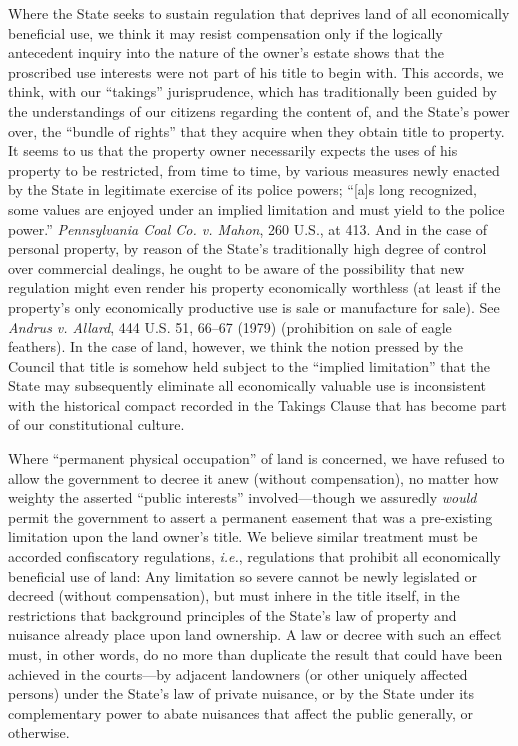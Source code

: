 Where the State seeks to sustain regulation that deprives land of all
economically beneficial use, we think it may resist compensation only if the
logically antecedent inquiry into the nature of the owner's estate shows that
the proscribed use interests were not part of his title to begin with. This
accords, we think, with our ``takings'' jurisprudence, which has traditionally
been guided by the understandings of our citizens regarding the content of, and
the State's power over, the ``bundle of rights'' that they acquire when they
obtain title to property. It seems to us that the property owner necessarily
expects the uses of his property to be restricted, from time to time, by various
measures newly enacted by the State in legitimate exercise of its police powers;
``[a]s long recognized, some values are enjoyed under an implied limitation and
must yield to the police power.'' \textit{Pennsylvania Coal Co. v. Mahon}, 260
U.S., at 413. And in the case of personal property, by reason of the State's
traditionally high degree of control over commercial dealings, he ought to be
aware of the possibility that new regulation might even render his property
economically worthless (at least if the property's only economically productive
use is sale or manufacture for sale). See \textit{Andrus v. Allard}, 444 U.S.
51, 66--67 (1979) (prohibition on sale of eagle feathers). In the case of land,
however, we think the notion pressed by the Council that title is somehow held
subject to the ``implied limitation'' that the State may subsequently eliminate
all economically valuable use is inconsistent with the historical compact
recorded in the Takings Clause that has become part of our constitutional
culture.

Where ``permanent physical occupation'' of land is concerned, we have refused to
allow the government to decree it anew (without compensation), no matter how
weighty the asserted ``public interests'' involved---though we assuredly
\textit{would} permit the government to assert a permanent easement that was a
pre-existing limitation upon the land owner's title. We believe similar
treatment must be accorded confiscatory regulations, \textit{i.e.}, regulations
that prohibit all economically beneficial use of land: Any limitation so severe
cannot be newly legislated or decreed (without compensation), but must inhere in
the title itself, in the restrictions that background principles of the State's
law of property and nuisance already place upon land ownership. A law or decree
with such an effect must, in other words, do no more than duplicate the result
that could have been achieved in the courts---by adjacent landowners (or other
uniquely affected persons) under the State's law of private nuisance, or by the
State under its complementary power to abate nuisances that affect the public
generally, or otherwise.

